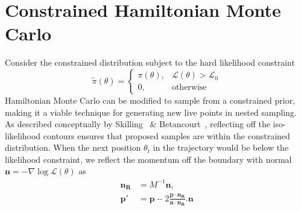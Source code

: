 \documentclass[11pt]{article}
\begin{document}
\section{Constrained Hamiltonian Monte Carlo}\label{sec:chmc}
    Consider the constrained distribution subject to the hard likelihood constraint
    \begin{equation}\label{eq:constrained_prior}
        \tilde{\pi}(\theta) = \begin{cases}
                                  \pi(\theta), & \mathcal{L}(\theta) > \mathcal{L}_0 \\
                                  0, & \text{otherwise}
                              \end{cases}
    \end{equation}
    Hamiltonian Monte Carlo can be modified to sample from a constrained prior, making it a viable
    technique for generating new live points in nested sampling.
    As described conceptually by Skilling~\cite{GMC} \& Betancourt~\cite{Betancourt_NS_CHMC}, reflecting
    off the iso-likelihood contours ensures that proposed samples are within the constrained distribution.
    When the next position $\theta_t$ in the trajectory would be below the likelihood constraint, we reflect the
    momentum off the boundary with normal $\mathbf{n} = - \nabla \log{\mathcal{L}(\theta)}$ as
    \begin{equation}\label{eq:reflection}
    \begin{aligned}
        \mathbf{n_R} &= M^{-1} \mathbf{n}, \\
        \mathbf{p'} &= \mathbf{p} - 2 \frac{ \mathbf{p} \cdot \mathbf{n_R} }{\mathbf{n} \cdot \mathbf{n_R}}. \mathbf{n}
    \end{aligned}
    \end{equation}
\end{document}

